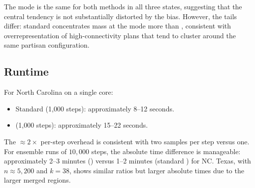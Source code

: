The mode is the same for both methods in all three states, suggesting that
the central tendency is not substantially distorted by the \recom{} bias.
However, the tails differ: standard \recom{} concentrates mass at the mode
more than \fr{}, consistent with overrepresentation of high-connectivity
plans that tend to cluster around the same partisan configuration.

\subsection{Runtime}

For North Carolina on a single core:
\begin{itemize}
  \item Standard \recom{} (1{,}000 steps): approximately 8--12 seconds.
  \item \fr{} (1{,}000 steps): approximately 15--22 seconds.
\end{itemize}
The $\approx\!2\times$ per-step overhead is consistent with two \ust{} samples
per step versus one.
For ensemble runs of $10{,}000$ steps, the absolute time difference is
manageable: approximately 2--3 minutes (\fr{}) versus 1--2 minutes (standard
\recom{}) for NC.
Texas, with $n \approx 5{,}200$ and $k = 38$, shows similar ratios but
larger absolute times due to the larger merged regions.
